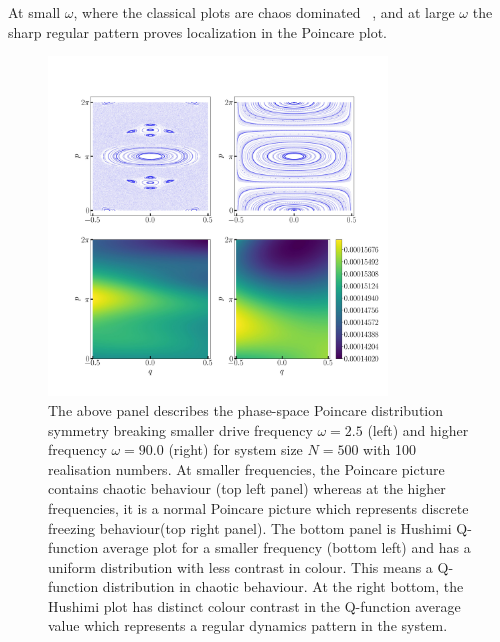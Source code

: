 \documentclass[%
 reprint,
 amsmath,amssymb,
 aps,
]{revtex4-2}
\begin{document}
At small $\omega$, where the classical plots are chaos dominated ~\cite{reichl_transition_2021}, and at large $\omega$ the sharp regular pattern proves localization in the Poincare plot. 
\begin{figure}[ht!]
	\centering
	\includegraphics[height = 9.0cm, width = 9.0 cm]{lmg_poincare.jpeg}
	\caption{The above panel describes the phase-space Poincare distribution symmetry breaking smaller drive frequency $\omega = 2.5$ (left) and higher frequency $\omega = 90.0$ (right) for system size $N=500$ with 100 realisation numbers. At smaller frequencies, the Poincare picture contains chaotic behaviour (top left panel) whereas at the higher frequencies, it is a normal Poincare picture which represents discrete freezing behaviour(top right panel). The bottom panel is Hushimi Q-function average plot for  a smaller frequency (bottom left) and has a uniform distribution with less contrast in colour. This means a Q-function distribution in chaotic behaviour. At the right bottom, the Hushimi plot has distinct colour contrast in the Q-function average value which represents a regular dynamics pattern in the system.}
	\label{fig:classical_lipkin}
\end{figure}
\end{document}
